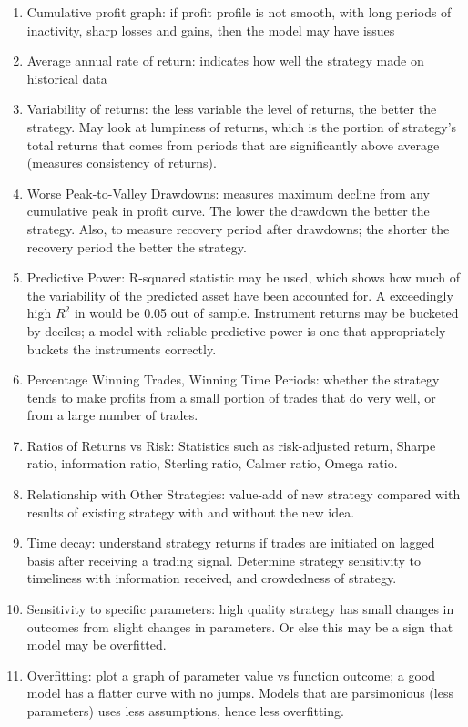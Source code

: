 \begin{remark} 
\begin{enumerate}[label=\roman*.]
\setlength{\itemsep}{0pt}
\item Cumulative profit graph: if profit profile is not smooth, with long periods of inactivity, sharp losses and gains, then the model may have issues
\item Average annual rate of return: indicates how well the strategy made on historical data
\item Variability of returns: the less variable the level of returns, the better the strategy. May look at lumpiness of returns, which is the portion of strategy's total returns that comes from periods that are significantly above average (measures consistency of returns).
\item Worse Peak-to-Valley Drawdowns: measures maximum decline from any cumulative peak in profit curve. The lower the drawdown the better the strategy. Also, to measure recovery period after drawdowns; the shorter the recovery period the better the strategy.
\item Predictive Power: R-squared statistic may be used, which shows how much of the variability of the predicted asset have been accounted for. A exceedingly high $R^2$ in would be 0.05 out of sample. Instrument returns may be bucketed by deciles; a model with reliable predictive power is one that appropriately buckets the instruments correctly.
\item Percentage Winning Trades, Winning Time Periods: whether the strategy tends to make profits from a small portion of trades that do very well, or from a large number of trades. 
\item Ratios of Returns vs Risk: Statistics such as risk-adjusted return, Sharpe ratio, information ratio, Sterling ratio, Calmer ratio, Omega ratio.
\item Relationship with Other Strategies: value-add of new strategy compared with results of existing strategy with and without the new idea.
\item Time decay: understand strategy returns if trades are initiated on lagged basis after receiving a trading signal. Determine strategy sensitivity to timeliness with information received, and crowdedness of strategy.
\item Sensitivity to specific parameters: high quality strategy has small changes in outcomes from slight changes in parameters. Or else this may be a sign that model may be overfitted.
\item Overfitting: plot a graph of parameter value vs function outcome; a good model has a flatter curve with no jumps.  Models that are parsimonious (less parameters) uses less assumptions, hence less overfitting.
\end{enumerate}
\end{remark}

